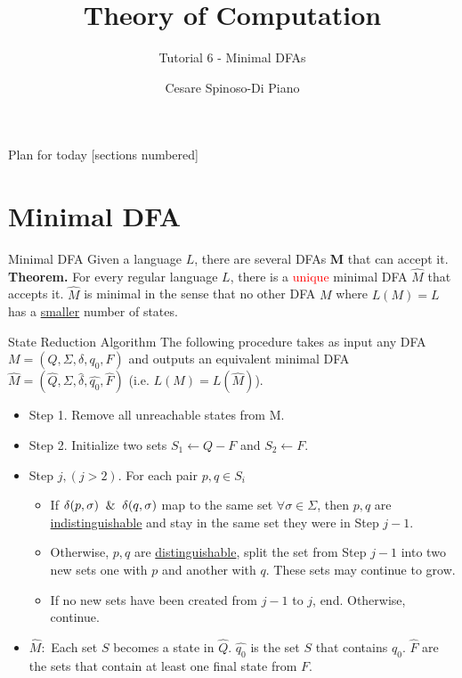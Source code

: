 \documentclass[10pt]{beamer}
\title{Theory of Computation}
\subtitle{Tutorial 6 - Minimal DFAs}
\author{Cesare Spinoso-Di Piano}
\date{}
\begin{document}
\maketitle

\begin{frame}{Plan for today}
    [sections numbered]
    \tableofcontents[hideallsubsections]
\end{frame}


\section{Minimal DFA}

\begin{frame}{Minimal DFA}
    Given a language $L$, there are several DFAs \textbf{M} that can accept it.\\ \bigskip
    \textbf{Theorem.} For every regular language $L$, there is a \textcolor{red}{unique} minimal DFA $\hat{M}$ that accepts it. $\hat{M}$ is minimal in the sense that no other DFA $M$ where $L(M) = L$ has a \underline{smaller} number of states.
\end{frame}

\begin{frame}[t]{State Reduction Algorithm}
    The following procedure takes as input any DFA $M = (Q, \Sigma, \delta, q_0, F)$ and outputs an equivalent minimal DFA $\hat{M} = (\hat{Q}, \Sigma, \hat{\delta}, \hat{q_0}, \hat{F})$ (i.e. $L(M) = L(\hat{M})$).
    \begin{itemize}
        \item Step 1. Remove all unreachable states from M.
        \item Step 2. Initialize two sets $S_1 \leftarrow Q - F$ and $S_2 \leftarrow F$.
        \item Step $j, (j > 2)$. For each pair $p, q \in S_i$
              \begin{itemize}
                  \item If $\delta(p, \sigma) \And \delta(q, \sigma)$ map to the same set $\forall \sigma \in \Sigma$, then $p,q$ are \underline{indistinguishable} and stay in the same set they were in Step $j-1$.
                  \item Otherwise, $p,q$ are \underline{distinguishable}, split the set from Step $j-1$ into two new sets one with $p$ and another with $q$. These sets may continue to grow.
                  \item If no new sets have been created from $j-1$ to $j$, end. Otherwise, continue.
              \end{itemize}
        \item $\hat{M}:$ Each set $S$ becomes a state in $\hat{Q}$. $\hat{q_0}$ is the set $S$ that contains $q_0$. $\hat{F}$ are the sets that contain at least one final state from $F$.
    \end{itemize}
\end{frame}
\end{document}
